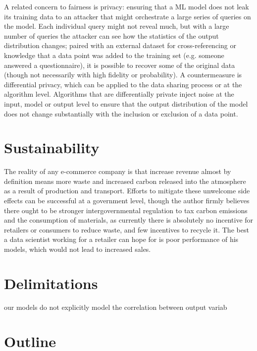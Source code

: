 A related concern to fairness is privacy: ensuring that a ML model does not leak its training data to an attacker that might orchestrate a large series of queries on the model.
Each individual query might not reveal much, but with a large number of queries the attacker can see how the statistics of the output distribution changes; paired with an external dataset for cross-referencing or knowledge that a data point was added to the training set (e.g. someone answered a questionnaire), it is possible to recover some of the original data (though not necessarily with high fidelity or probability).
A countermeasure is differential privacy, which can be applied to the data sharing process or at the algorithm level.
Algorithms that are differentially private inject noise at the input, model or output level to ensure that the output distribution of the model does not change substantially with the inclusion or exclusion of a data point.

\section{Sustainability}

The reality of any e-commerce company is that increase revenue almost by definition means more waste  and increased carbon released into the atmosphere  as a result of production and transport.
Efforts to mitigate these unwelcome side effects can be successful at a government level, though  the author firmly believes there ought to be stronger intergovernmental regulation to tax carbon emissions and the consumption of materials, as currently there is absolutely no incentive for retailers or consumers to reduce waste, and few incentives to recycle it.
The best a data scientist working for a retailer can hope for is poor performance of his models, which would not lead to increased sales.

\section{Delimitations}

our models do not explicitly model the correlation between output variab

\section{Outline}
